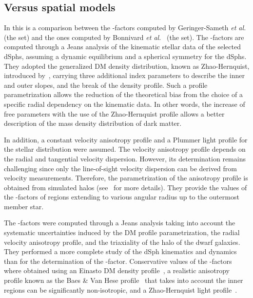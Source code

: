\subsection{\GS Versus \B spatial models}\label{sec:gd_gsVb}

In this is a comparison between the \J-factors computed by Geringer-Sameth \emph{et al.}~\cite{Geringer-Sameth:2014yza} (the \GS set) and the ones computed by Bonnivard \emph{et al.}~\cite{Bonnivard:2014kza, Bonnivard:2015xpq} (the \B set).
%
The \GS \J-factors are computed through a Jeans analysis of the kinematic stellar data of the  selected dSphs, assuming a dynamic equilibrium and a spherical symmetry for the dSphs.
They adopted the generalized DM density distribution, known as Zhao-Hernquist, introduced by~\cite{Zhao:1995cp}, carrying three additional index parameters to describe the inner and outer slopes, and the break of the density profile.
Such a profile parametrization allows the reduction of the theoretical bias from the choice of a specific radial dependency on the kinematic data.
In other words, the increase of free parameters with the use of the  Zhao-Hernquist profile allows a better description of the mass density distribution of dark matter.

In addition, a constant velocity anisotropy profile and a Plummer light profile \cite{10.1093/mnras/71.5.460} for the stellar distribution were assumed.
The velocity anisotropy profile depends on the radial and tangential velocity dispersion.
However, its determination remains challenging since only the line-of-sight velocity dispersion can be derived from velocity measurements.
Therefore, the parametrization of the anisotropy profile is obtained from simulated halos (see~\cite{Hunter:2013vua} for more details).
They provide the values of the \J-factors of regions extending to various angular radius up to the outermost member star.

The \B \J-factors were computed through a Jeans analysis taking into account the systematic uncertainties induced by the DM profile parametrization, the radial velocity anisotropy profile, and the triaxiality of the halo of the dwarf galaxies.
They performed a more complete study of the dSph kinematics and dynamics than \GS for the determination of the \J-factor.
Conservative values of the \J-factors where obtained using an Einasto DM density profile~\cite{Dhar_2010}, a realistic anisotropy profile known as the Baes \& Van Hese profile~\cite{Baes:2007tx} that takes into account the inner regions can be significantly non-isotropic, and a Zhao-Hernquist light profile~\cite{Zhao:1995cp}.

